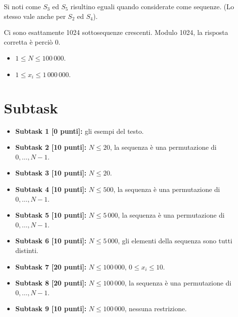 Si noti come $S_3$ ed $S_5$ risultino eguali quando considerate come sequenze.
(Lo stesso vale anche per $S_2$ ed $S_4$).


Ci sono esattamente 1024 sottosequenze crescenti.
Modulo 1024, la risposta corretta è perciò 0.

\begin{itemize}[nolistsep, noitemsep]
  \item $1 \leq N \leq 100\,000$.
  \item $1 \leq x_i \leq 1\,000\,000$.
\end{itemize}
  
\section*{Subtask}
\begin{itemize}
  \item \textbf{Subtask 1 [0 punti]:} gli esempi del testo.
  \item \textbf{Subtask 2 [10 punti]:} $N \leq 20$, la sequenza è una permutazione di $0, \ldots, N-1$.
  \item \textbf{Subtask 3 [10 punti]:} $N \leq 20$.
  \item \textbf{Subtask 4 [10 punti]:} $N \leq 500$, la sequenza è una permutazione di $0, \ldots, N-1$.
  \item \textbf{Subtask 5 [10 punti]:} $N \leq 5\,000$, la sequenza è una permutazione di $0, \ldots, N-1$.
  \item \textbf{Subtask 6 [10 punti]:} $N \leq 5\,000$, gli elementi della sequenza sono tutti distinti.
  \item \textbf{Subtask 7 [20 punti]:} $N \leq 100\,000$, $0 \leq x_i \leq 10$.
  \item \textbf{Subtask 8 [20 punti]:} $N \leq 100\,000$, la sequenza è una permutazione di $0, \ldots, N-1$.
  \item \textbf{Subtask 9 [10 punti]:} $N \leq 100\,000$, nessuna restrizione.
\end{itemize}
